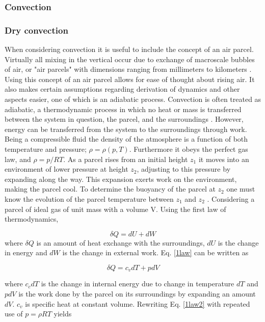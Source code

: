 \subsubsection{Convection}

\subsubsection{Dry convection}

When considering convection it is useful to include the concept of an air parcel. Virtually all mixing in the vertical occur due to exchange of macroscale bubbles of air, or "air parcels" with dimensions ranging from millimeters to kilometers \cite{Wallace}. Using this concept of an air parcel allows for ease of thought about rising air. It also makes certain assumptions regarding derivation of dynamics and other aspects easier, one of which is an adiabatic process. Convection is often treated as adiabatic, a thermodynamic process in which no heat or mass is transferred between the system in question, the parcel, and the surroundings \cite{Wallace}. However, energy can be transferred from the system to the surroundings through work. Being a compressible fluid the density of the atmosphere is a function of both temperature and pressure; $\rho = \rho(p,T)$. Furthermore it obeys the perfect gas law, and $\rho = p/RT$. As a parcel rises from an initial height $z_1$ it moves into an environment of lower pressure at height $z_2$, adjusting to this pressure by expanding along the way. This expansion exerts work on the environment, making the parcel cool. To determine the buoyancy of the parcel at $z_2$ one must know the evolution of the parcel temperature between $z_1$ and $z_2$ \cite{Marshall}. Considering a parcel of ideal gas of unit mass with a volume V. Using the first law of thermodynamics,

\begin{equation}
    \delta Q = dU + dW
    \label{1law}
\end{equation}
where $\delta Q$ is an amount of heat exchange with the surroundings, $dU$ is the change in energy and $dW$ is the change in external work. Eq. \eqref{1law} can be written as 

\begin{equation}
    \delta Q = c_vdT + pdV
    \label{1law2}
\end{equation}

where $c_cdT$ is the change in internal energy due to change in temperature $dT$ and $pdV$ is the work done by the parcel on its surroundings by expanding an amount $dV$. $c_v$ is specific heat at constant volume. Rewriting Eq. \eqref{1law2} with repeated use of $p=\rho RT$ yields 


